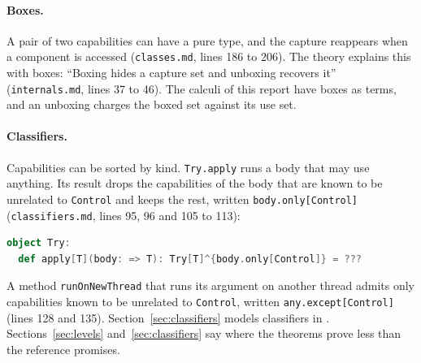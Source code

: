 \paragraph{Boxes.}
A pair of two capabilities can have a pure type, and the capture reappears when a component is accessed (\texttt{classes.md}, lines 186 to 206). The theory explains this with boxes: ``Boxing hides a capture set and unboxing recovers it'' (\texttt{internals.md}, lines 37 to 46). The calculi of this report have boxes as terms, and an unboxing charges the boxed set against its use set.

\paragraph{Classifiers.}
Capabilities can be sorted by kind. \lstinline|Try.apply| runs a body that may use anything. Its result drops the capabilities of the body that are known to be unrelated to \lstinline|Control| and keeps the rest, written \lstinline|body.only[Control]| (\texttt{classifiers.md}, lines 95, 96 and 105 to 113):
\begin{lstlisting}[language=Scala]
object Try:
  def apply[T](body: => T): Try[T]^{body.only[Control]} = ???
\end{lstlisting}
A method \lstinline|runOnNewThread| that runs its argument on another thread admits only capabilities known to be unrelated to \lstinline|Control|, written \lstinline|any.except[Control]| (lines 128 and 135). Section~\ref{sec:classifiers} models classifiers in \treeCL. Sections~\ref{sec:levels} and~\ref{sec:classifiers} say where the theorems prove less than the reference promises.
